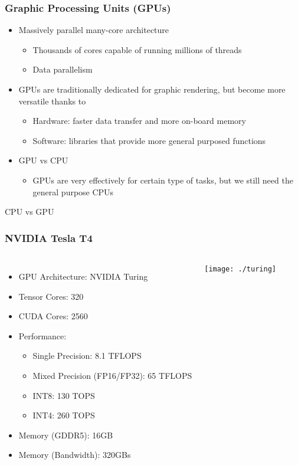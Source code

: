 \documentclass[10pt,t]{beamer}
\begin{document}
\begin{frame}
  \frametitle{Graphic Processing Units (GPUs)}
  \begin{itemize}
  \item Massively parallel many-core architecture
    \begin{itemize}
    \item Thousands of cores capable of running millions of threads
    \item Data parallelism
    \end{itemize}
  \item GPUs are traditionally dedicated for graphic rendering, but
    become more versatile thanks to
    \begin{itemize}
    \item Hardware: faster data transfer and more on-board memory
    \item Software: libraries that provide more general purposed
      functions
    \end{itemize}
  \item GPU vs CPU
    \begin{itemize}
    \item GPUs are very effectively for certain type of tasks, but we still need the general purpose CPUs
    \end{itemize}
  \end{itemize}
\end{frame}

\begin{frame}{CPU vs GPU}
\end{frame}
	
\begin{frame}
  \frametitle{NVIDIA Tesla T4}
  \begin{columns}[c]
    \begin{itemize}
    \item GPU Architecture: NVIDIA Turing
    \item Tensor Cores: 320
    \item CUDA Cores: 2560
    \item Performance: 
      \begin{itemize}
      \item Single Precision: 8.1 TFLOPS
      \item Mixed Precision (FP16/FP32): 65 TFLOPS
      \item INT8: 130 TOPS
      \item INT4: 260 TOPS
      \end{itemize}
    \item Memory (GDDR5): 16GB
    \item Memory (Bandwidth): 320GBs
    \end{itemize}
    \texttt{[image: ./turing]}
  \end{columns}
\end{frame}
\end{document}
